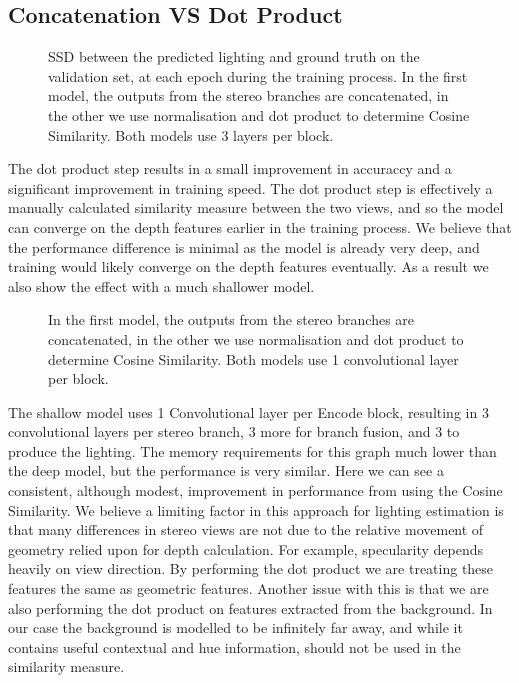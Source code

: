 \documentclass[ %
                    author={Gavin Parker},
                supervisor={Dr. Neill Campbell},
                    degree={MEng},
                     title={Deep Siamese Networks for Illumination Estimation from Stereo Images},
                  subtitle={},
                      type={Research},
                      year={2018} ]{dissertation}
\begin{document}
\subsection{Concatenation VS Dot Product}
\begin{figure}[H]
\setlength\figureheight{6cm}
\setlength\figurewidth{12cm}
\centering

\caption{SSD between the predicted lighting and ground truth on the validation set, at each epoch during the training process. In the first model, the outputs from the stereo branches are concatenated, in the other we use normalisation and dot product to determine Cosine Similarity. Both models use 3 layers per block.}
\end{figure}
The dot product step results in a small improvement in accuraccy and a significant improvement in training speed. The dot product step is effectively a manually calculated similarity measure between the two views, and so the model can converge on the depth features earlier in the training process. We believe that the performance difference is minimal as the model is already very deep, and training would likely converge on the depth features eventually.
As a result we also show the effect with a much shallower model.
\begin{figure}[H]
\setlength\figureheight{6cm}
\setlength\figurewidth{12cm}
\centering

\caption{In the first model, the outputs from the stereo branches are concatenated, in the other we use normalisation and dot product to determine Cosine Similarity. Both models use 1 convolutional layer per block.}
\end{figure}
The shallow model uses 1 Convolutional layer per Encode block, resulting in 3 convolutional layers per stereo branch, 3 more for branch fusion, and 3 to produce the lighting. The memory requirements for this graph much lower than the deep model, but the performance is very similar. Here we can see a consistent, although modest, improvement in performance from using the Cosine Similarity. We believe a limiting factor in this approach for lighting estimation is that many differences in stereo views are not due to the relative movement of geometry relied upon for depth calculation. For example, specularity depends heavily on view direction. By performing the dot product we are treating these features the same as geometric features.
\newline
Another issue with this is that we are also performing the dot product on features extracted from the background. In our case the background is modelled to be infinitely far away, and while it contains useful contextual and hue information, should not be used in the similarity measure.
\end{document}
